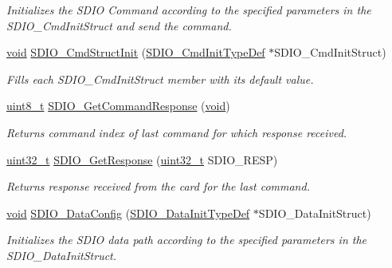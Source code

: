 \begin{DoxyCompactItemize}
\begin{DoxyCompactList}\small\item\em Initializes the S\+D\+IO Command according to the specified parameters in the S\+D\+I\+O\+\_\+\+Cmd\+Init\+Struct and send the command. \end{DoxyCompactList}\item 
\hyperlink{usb__devapi_8h_afabf60e7f57651d6d595a02c75f07cd0}{void} \hyperlink{group___s_d_i_o___private___functions_ga09d9e89f49c87c82aec79c97b7068e24}{S\+D\+I\+O\+\_\+\+Cmd\+Struct\+Init} (\hyperlink{struct_s_d_i_o___cmd_init_type_def}{S\+D\+I\+O\+\_\+\+Cmd\+Init\+Type\+Def} $\ast$S\+D\+I\+O\+\_\+\+Cmd\+Init\+Struct)
\begin{DoxyCompactList}\small\item\em Fills each S\+D\+I\+O\+\_\+\+Cmd\+Init\+Struct member with its default value. \end{DoxyCompactList}\item 
\hyperlink{_p_e___types_8h_aba7bc1797add20fe3efdf37ced1182c5}{uint8\+\_\+t} \hyperlink{group___s_d_i_o___private___functions_ga9badf271c818e09da301d715c4ad0e5b}{S\+D\+I\+O\+\_\+\+Get\+Command\+Response} (\hyperlink{usb__devapi_8h_afabf60e7f57651d6d595a02c75f07cd0}{void})
\begin{DoxyCompactList}\small\item\em Returns command index of last command for which response received. \end{DoxyCompactList}\item 
\hyperlink{_p_e___types_8h_a33594304e786b158f3fb30289278f5af}{uint32\+\_\+t} \hyperlink{group___s_d_i_o___private___functions_ga5c1e859511840e8cca6a9a768bce220b}{S\+D\+I\+O\+\_\+\+Get\+Response} (\hyperlink{_p_e___types_8h_a33594304e786b158f3fb30289278f5af}{uint32\+\_\+t} S\+D\+I\+O\+\_\+\+R\+E\+SP)
\begin{DoxyCompactList}\small\item\em Returns response received from the card for the last command. \end{DoxyCompactList}\item 
\hyperlink{usb__devapi_8h_afabf60e7f57651d6d595a02c75f07cd0}{void} \hyperlink{group___s_d_i_o___private___functions_gad65d896ae919683585bda44a1e2afae4}{S\+D\+I\+O\+\_\+\+Data\+Config} (\hyperlink{struct_s_d_i_o___data_init_type_def}{S\+D\+I\+O\+\_\+\+Data\+Init\+Type\+Def} $\ast$S\+D\+I\+O\+\_\+\+Data\+Init\+Struct)
\begin{DoxyCompactList}\small\item\em Initializes the S\+D\+IO data path according to the specified parameters in the S\+D\+I\+O\+\_\+\+Data\+Init\+Struct. \end{DoxyCompactList}\item 

\end{DoxyCompactItemize}
